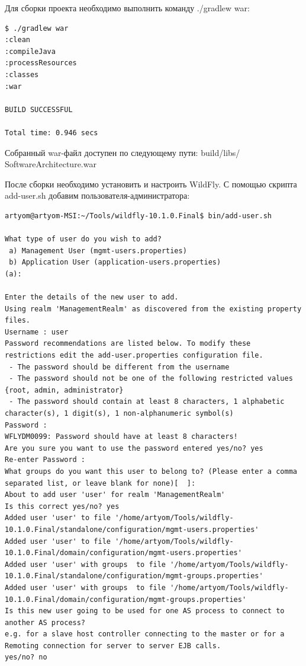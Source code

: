 Для сборки проекта необходимо выполнить команду ./gradlew war:

\begin{lstlisting}
$ ./gradlew war
:clean
:compileJava
:processResources
:classes
:war

BUILD SUCCESSFUL

Total time: 0.946 secs
\end{lstlisting}

Собранный war-файл доступен по следующему пути: build/libs/\\SoftwareArchitecture.war

После сборки необходимо установить и настроить WildFly. С помощью скрипта add-user.sh добавим пользователя-администратора:

\begin{lstlisting}
artyom@artyom-MSI:~/Tools/wildfly-10.1.0.Final$ bin/add-user.sh 

What type of user do you wish to add? 
 a) Management User (mgmt-users.properties) 
 b) Application User (application-users.properties)
(a): 

Enter the details of the new user to add.
Using realm 'ManagementRealm' as discovered from the existing property files.
Username : user
Password recommendations are listed below. To modify these restrictions edit the add-user.properties configuration file.
 - The password should be different from the username
 - The password should not be one of the following restricted values {root, admin, administrator}
 - The password should contain at least 8 characters, 1 alphabetic character(s), 1 digit(s), 1 non-alphanumeric symbol(s)
Password : 
WFLYDM0099: Password should have at least 8 characters!
Are you sure you want to use the password entered yes/no? yes
Re-enter Password : 
What groups do you want this user to belong to? (Please enter a comma separated list, or leave blank for none)[  ]: 
About to add user 'user' for realm 'ManagementRealm'
Is this correct yes/no? yes
Added user 'user' to file '/home/artyom/Tools/wildfly-10.1.0.Final/standalone/configuration/mgmt-users.properties'
Added user 'user' to file '/home/artyom/Tools/wildfly-10.1.0.Final/domain/configuration/mgmt-users.properties'
Added user 'user' with groups  to file '/home/artyom/Tools/wildfly-10.1.0.Final/standalone/configuration/mgmt-groups.properties'
Added user 'user' with groups  to file '/home/artyom/Tools/wildfly-10.1.0.Final/domain/configuration/mgmt-groups.properties'
Is this new user going to be used for one AS process to connect to another AS process? 
e.g. for a slave host controller connecting to the master or for a Remoting connection for server to server EJB calls.
yes/no? no
\end{lstlisting}


